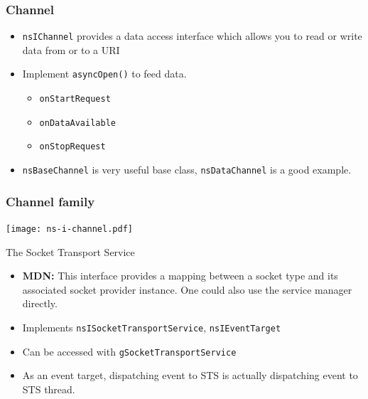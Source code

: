 \documentclass{beamer}
\begin{document}
\begin{frame}
  \frametitle{Channel}
  \begin{itemize}
  \item \texttt{nsIChannel} provides a data access interface which allows you to read or write data from or to a URI
  \item Implement \texttt{asyncOpen()} to feed data.
    \begin{itemize}
      \item \texttt{onStartRequest}
      \item \texttt{onDataAvailable}
      \item \texttt{onStopRequest}
    \end{itemize}
  \item \texttt{nsBaseChannel} is very useful base class, \texttt{nsDataChannel} is a good example.
  \end{itemize}
\end{frame}

\begin{frame}[fragile]
  \frametitle{Channel family}
  \begin{center}
    \texttt{[image: ns-i-channel.pdf]}
  \end{center}
\end{frame}


\begin{frame}{The Socket Transport Service}
  \begin{itemize}
  \item \textbf{MDN:} This interface provides a mapping between a socket type and its associated socket provider instance. One could also use the service manager directly. 
  \item Implements \texttt{nsISocketTransportService}, \texttt{nsIEventTarget}
  \item Can be accessed with \texttt{gSocketTransportService}
  \item As an event target, dispatching event to STS is actually dispatching event to STS thread.
  \end{itemize}
\end{frame}
\end{document}
